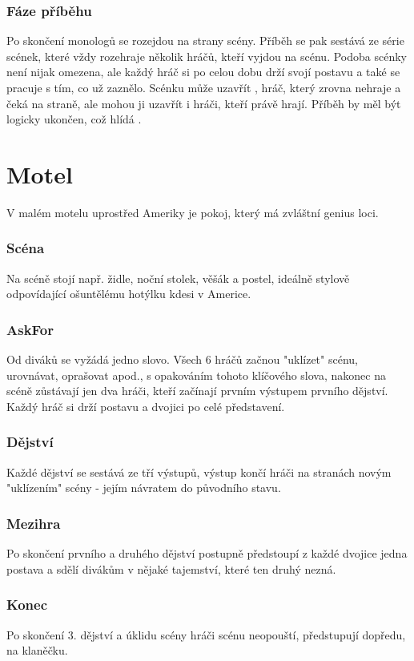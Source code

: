 \subsubsection{ Fáze příběhu } Po skončení monologů se  rozejdou na strany scény. Příběh se pak sestává ze série scének, které vždy rozehraje několik hráčů, kteří vyjdou na scénu. Podoba scénky není nijak omezena, ale každý hráč si po celou dobu drží svojí postavu a také se pracuje s tím, co už zaznělo. Scénku může uzavřít , hráč, který zrovna nehraje a čeká na straně, ale mohou ji uzavřít i hráči, kteří právě hrají. Příběh by měl být logicky ukončen, což hlídá . 
 
 
 
\needspace{5cm} \section{Motel} \label{motel} V malém motelu uprostřed Ameriky je pokoj, který má zvláštní genius loci. 
\subsubsection{Scéna} Na scéně stojí např. židle, noční stolek, věšák a postel, ideálně stylově odpovídající ošuntělému hotýlku kdesi v Americe. 
\subsubsection{AskFor} Od diváků se vyžádá jedno slovo.  
Všech 6 hráčů začnou "uklízet"{} scénu, urovnávat, oprašovat apod., s opakováním tohoto klíčového slova, nakonec na scéně zůstávají jen dva hráči, kteří začínají prvním výstupem prvního dějství. 
Každý hráč si drží postavu a dvojici po celé představení. 
\subsubsection{Dějství} Každé dějství se sestává ze tří výstupů, výstup končí hráči na stranách novým "uklízením"{} scény - jejím návratem do původního stavu. 
\subsubsection{Mezihra} Po skončení prvního a druhého dějství postupně předstoupí z každé dvojice jedna postava a sdělí divákům v  nějaké tajemství, které ten druhý nezná. 
\subsubsection{Konec} Po skončení 3. dějství a úklidu scény hráči scénu neopouští, předstupují dopředu, na klaněčku. 
 
